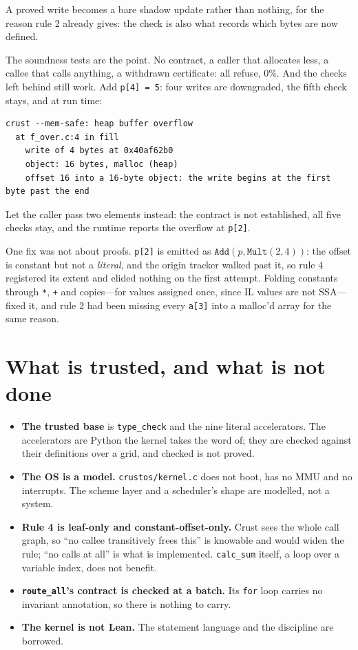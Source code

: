 \documentclass[11pt]{article}
\newcommand{\code}[1]{\texttt{#1}}
\begin{document}
A proved write becomes a bare shadow update rather than nothing, for the
reason rule 2 already gives: the check is also what records which bytes are
now defined.

The soundness tests are the point. No contract, a caller that allocates less,
a callee that calls anything, a withdrawn certificate: all refuse, 0\%. And the
checks left behind still work. Add \code{p[4] = 5}: four writes are
downgraded, the fifth check stays, and at run time:

\begin{lstlisting}[language={}]
crust --mem-safe: heap buffer overflow
  at f_over.c:4 in fill
    write of 4 bytes at 0x40af62b0
    object: 16 bytes, malloc (heap)
    offset 16 into a 16-byte object: the write begins at the first byte past the end
\end{lstlisting}

Let the caller pass two elements instead: the contract is not established,
all five checks stay, and the runtime reports the overflow at
\code{p[2]}.

One fix was not about proofs. \code{p[2]} is emitted as
$\code{Add}(p, \code{Mult}(2, 4))$: the offset is constant but not a
\emph{literal}, and the origin tracker walked past it, so rule 4 registered
its extent and elided nothing on the first attempt. Folding constants through
\code{*}, \code{+} and copies---for values assigned once, since IL values are
not SSA---fixed it, and rule 2 had been missing every \code{a[3]} into a
malloc'd array for the same reason.

\section{What is trusted, and what is not done}
\label{sec:limits}

\begin{itemize}
\item \textbf{The trusted base} is \code{type\_check} and the nine literal
  accelerators. The accelerators are Python the kernel takes the word of; they
  are checked against their definitions over a grid, and checked is not
  proved.
\item \textbf{The OS is a model.} \code{crustos/kernel.c} does not boot, has
  no MMU and no interrupts. The scheme layer and a scheduler's shape are
  modelled, not a system.
\item \textbf{Rule 4 is leaf-only and constant-offset-only.} Crust sees the
  whole call graph, so ``no callee transitively frees this'' is knowable and
  would widen the rule; ``no calls at all'' is what is implemented.
  \code{calc\_sum} itself, a loop over a variable index, does not benefit.
\item \textbf{\code{route\_all}'s contract is checked at a batch.} Its
  \code{for} loop carries no invariant annotation, so there is nothing to
  carry.
\item \textbf{The kernel is not Lean.} The statement language and the discipline are borrowed.
\end{itemize}
\end{document}
